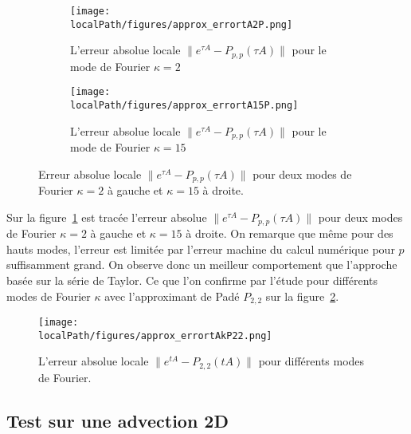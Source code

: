 \begin{figure}
  \begin{subfigure}{.5\textwidth}
    \centering
    \texttt{[image: \\localPath/figures/approx\_errortA2P.png]}
    \caption{L'erreur absolue locale $\|e^{\tau A}-P_{p,p}(\tau A)\|$ pour le mode de Fourier $\kappa=2$}
  \end{subfigure}
  \begin{subfigure}{.5\textwidth}
    \centering
    \texttt{[image: \\localPath/figures/approx\_errortA15P.png]}
    \caption{L'erreur absolue locale $\|e^{\tau A}-P_{p,p}(\tau A)\|$ pour le mode de Fourier $\kappa=15$}
  \end{subfigure}
  \caption{Erreur absolue locale $\|e^{\tau A}-P_{p,p}(\tau A)\|$ pour deux modes de Fourier $\kappa=2$ à gauche et $\kappa=15$ à droite.}
  \label{fig:pade:error}
\end{figure}

Sur la figure~\ref{fig:pade:error} est tracée l'erreur absolue $\|e^{\tau A}-P_{p,p}(\tau A)\|$ pour deux modes de Fourier $\kappa=2$ à gauche et $\kappa=15$ à droite. On remarque que même pour des hauts modes, l'erreur est limitée par l'erreur machine du calcul numérique pour $p$ suffisamment grand. On observe donc un meilleur comportement que l'approche basée sur la série de Taylor. Ce que l'on confirme par l'étude pour différents modes de Fourier $\kappa$ avec l'approximant de Padé $P_{2,2}$ sur la figure~\ref{fig:pade:error22}.

\begin{figure}
  \centering
  \texttt{[image: \\localPath/figures/approx\_errortAkP22.png]}
  \caption{L'erreur absolue locale $\|e^{tA}-P_{2,2}(tA)\|$ pour différents modes de Fourier.}
  \label{fig:pade:error22}
\end{figure}


\subsection{Test sur une advection 2D}

